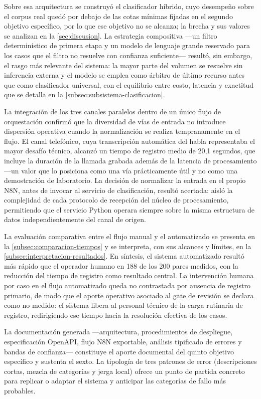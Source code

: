 Sobre esa arquitectura se construyó el clasificador híbrido, cuyo desempeño sobre el corpus real quedó por debajo de las cotas mínimas fijadas en el segundo objetivo específico, por lo que ese objetivo no se alcanza; la brecha y sus valores se analizan en la \autoref{sec:discusion}. La estrategia compositiva ---un filtro determinístico de primera etapa y un modelo de lenguaje grande reservado para los casos que el filtro no resuelve con confianza suficiente--- resultó, sin embargo, el rasgo más relevante del sistema: la mayor parte del volumen se resuelve sin inferencia externa y el modelo se emplea como árbitro de último recurso antes que como clasificador universal, con el equilibrio entre costo, latencia y exactitud que se detalla en la \autoref{subsec:subsistema-clasificacion}.

La integración de los tres canales paralelos dentro de un único flujo de orquestación confirmó que la diversidad de vías de entrada no introduce dispersión operativa cuando la normalización se realiza tempranamente en el flujo. El canal telefónico, cuya transcripción automática del habla representaba el mayor desafío técnico, alcanzó un tiempo de registro medio de 20,1 segundos, que incluye la duración de la llamada grabada además de la latencia de procesamiento ---un valor que lo posiciona como una vía prácticamente útil y no como una demostración de laboratorio. La decisión de normalizar la entrada en el propio N8N, antes de invocar al servicio de clasificación, resultó acertada: aisló la complejidad de cada protocolo de recepción del núcleo de procesamiento, permitiendo que el servicio Python operara siempre sobre la misma estructura de datos independientemente del canal de origen.

La evaluación comparativa entre el flujo manual y el automatizado se presenta en la \autoref{subsec:comparacion-tiempos} y se interpreta, con sus alcances y límites, en la \autoref{subsec:interpretacion-resultados}. En síntesis, el sistema automatizado resultó más rápido que el operador humano en 188 de los 200 pares medidos, con la reducción del tiempo de registro como resultado central. La intervención humana por caso en el flujo automatizado queda no contrastada por ausencia de registro primario, de modo que el aporte operativo asociado al gate de revisión se declara como no medido: el sistema libera al personal técnico de la carga rutinaria de registro, redirigiendo ese tiempo hacia la resolución efectiva de los casos.

La documentación generada ---arquitectura, procedimientos de despliegue, especificación OpenAPI, flujo N8N exportable, análisis tipificado de errores y bandas de confianza--- constituye el aporte documental del quinto objetivo específico y sustenta el sexto. La tipología de tres patrones de error (descripciones cortas, mezcla de categorías y jerga local) ofrece un punto de partida concreto para replicar o adaptar el sistema y anticipar las categorías de fallo más probables.

